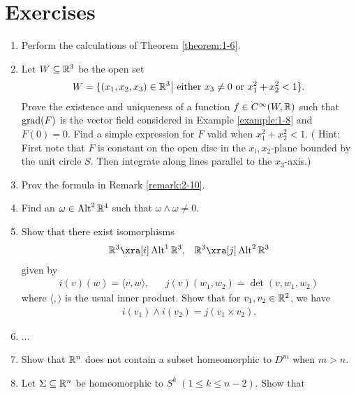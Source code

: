 \chapter{Exercises}
\setcounter{exercise}{1}
\newcommand{\newchap}{\stepcounter{exercise}\setcounter{enumi}{0}}


\begin{enumerate}[\theexercise.1.]
  \item Perform the calculations of Theorem \ref{theorem:1-6}.
  \item Let $W\subseteq\mathbb{R}^3$ be the open set 
    \begin{align*}
      W = \{(x_1, x_2, x_3)\in\mathbb{R}^3\big| \text{ either } x_3\neq 0 \text{ or } x_1^2 + x_2^2<1\}.
    \end{align*}
    Prove the existence and uniqueness of a function $f\in C^\infty(W, \mathbb{R})$ such that
    $\operatorname{grad}(F)$ is the vector field considered in Example \ref{example:1-8} and $F(0)= 0$.
    Find a simple expression for $F$ valid when $x_1^2 + x_2^2 < 1$. ( Hint: First note that $F$ is 
    constant on the open disc in the $x_l, x_2$-plane bounded by the unit circle $S$. Then integrate 
    along lines parallel to the $x_3$-axis.) \newchap
  \item Prov the formula in Remark \ref{remark:2-10}.
  \item Find an $\omega\in\operatorname{Alt}^2\mathbb{R}^4$ such that $\omega\wedge\omega\neq 0$.
  \item Show that there exist isomorphisms
    \begin{align*}
      \RR^3 \xra[i] \alt^1\RR^3, && \RR^3 \xra[j]\alt^2\RR^3 
    \end{align*}
    given by 
    \begin{align*}
      i(v)(w) = \langle v, w \rangle, && j(v)(w_1, w_2) = \det(v, w_1, w_2)
    \end{align*}
    where $\langle , \rangle$ is the usual inner product. Show that for $v_1, v_2\in\mathbb{R}^2$, we have 
    \begin{align*}
      i(v_1)\wedge i(v_2) = j(v_1\times v_2).
    \end{align*}
  \item ... \setcounter{exercise}{7}\setcounter{enumi}{0}
  \item Show that $\mathbb{R}^n$ does not contain a subset homeomorphic to $D^m$ when $m > n$.
  \item \label{exercise:7-2} Let $\Sigma\subseteq\mathbb{R}^n$ be homeomorphic 
    to $S^k\; (1\le k\le n-2)$. Show that 
    \begin{align*}

\end{align*}
\end{enumerate}
